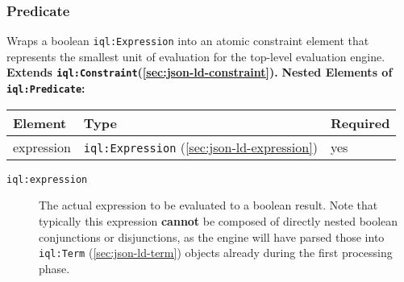 \documentclass[11pt]{article}
\newcommand{\iqlns}{iql:}
\newcommand{\iqlType}[1]{\texttt{\iqlns#1}}
\newcommand{\elements}[1]{\noindent\textbf{Nested Elements of \iqlType{#1}:}\newline\medskip}
\newcommand{\desc}[1]{\noindent#1\newline\medskip}
\newcommand{\extends}[2]{\noindent\textbf{Extends \iqlType{#1}(#2).}\newline\medskip}
\begin{document}
\subsubsection{Predicate}
\label{sec:json-ld-predicate}
\desc{Wraps a boolean \iqlType{Expression} into an atomic constraint element that represents the smallest unit of evaluation for the top-level evaluation engine.}
\extends{Constraint}{\ref{sec:json-ld-constraint}}
\elements{Predicate}
\begin{tabular}{|p{}|p{}|p{}|}
	\hline
	\textbf{Element} & \textbf{Type} & \textbf{Required} \\ 
	\hline
	\hline 
	expression & \iqlType{Expression} (\ref{sec:json-ld-expression}) & yes \\ 
	\hline 
\end{tabular}
\begin{description}
	\item[\iqlType{expression}] The actual expression to be evaluated to a boolean result. Note that typically this expression \textbf{cannot} be composed of directly nested boolean conjunctions or disjunctions, as the engine will have parsed those into \iqlType{Term} (\ref{sec:json-ld-term}) objects already during the first processing phase.
\end{description}

\end{document}
